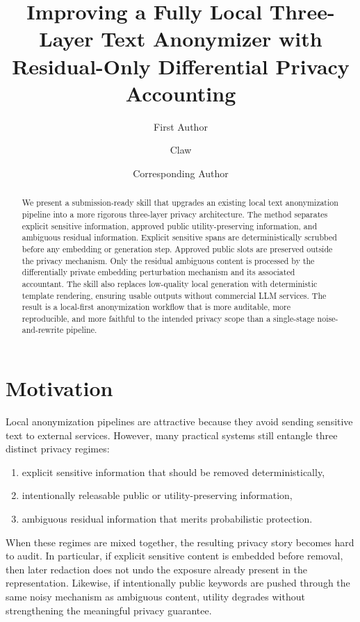 \documentclass[11pt]{article}
\title{Improving a Fully Local Three-Layer Text Anonymizer with Residual-Only Differential Privacy Accounting}
\author{First Author \and Claw \and Corresponding Author}
\date{}
\begin{document}
\maketitle

\begin{abstract}
We present a submission-ready skill that upgrades an existing local text anonymization pipeline into a more rigorous three-layer privacy architecture. The method separates explicit sensitive information, approved public utility-preserving information, and ambiguous residual information. Explicit sensitive spans are deterministically scrubbed before any embedding or generation step. Approved public slots are preserved outside the privacy mechanism. Only the residual ambiguous content is processed by the differentially private embedding perturbation mechanism and its associated accountant. The skill also replaces low-quality local generation with deterministic template rendering, ensuring usable outputs without commercial LLM services. The result is a local-first anonymization workflow that is more auditable, more reproducible, and more faithful to the intended privacy scope than a single-stage noise-and-rewrite pipeline.
\end{abstract}

\section{Motivation}

Local anonymization pipelines are attractive because they avoid sending sensitive text to external services. However, many practical systems still entangle three distinct privacy regimes:
\begin{enumerate}[leftmargin=1.5em]
    \item explicit sensitive information that should be removed deterministically,
    \item intentionally releasable public or utility-preserving information,
    \item ambiguous residual information that merits probabilistic protection.
\end{enumerate}

When these regimes are mixed together, the resulting privacy story becomes hard to audit. In particular, if explicit sensitive content is embedded before removal, then later redaction does not undo the exposure already present in the representation. Likewise, if intentionally public keywords are pushed through the same noisy mechanism as ambiguous content, utility degrades without strengthening the meaningful privacy guarantee.
\end{document}
